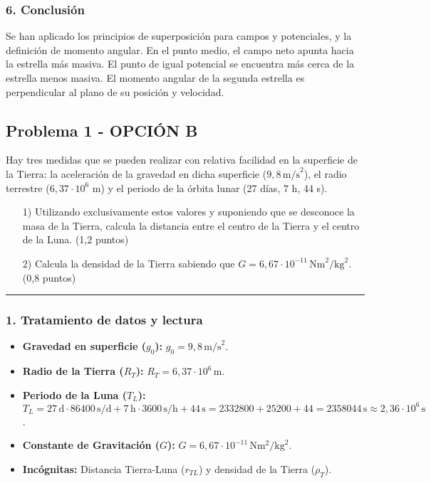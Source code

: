 \subsubsection*{6. Conclusión}
\begin{cajaconclusion}
Se han aplicado los principios de superposición para campos y potenciales, y la definición de momento angular. En el punto medio, el campo neto apunta hacia la estrella más masiva. El punto de igual potencial se encuentra más cerca de la estrella menos masiva. El momento angular de la segunda estrella es perpendicular al plano de su posición y velocidad.
\end{cajaconclusion}

\newpage

\subsection{Problema 1 - OPCIÓN B}
\label{subsec:1B_2009_jun_ord}

\begin{cajaenunciado}
Hay tres medidas que se pueden realizar con relativa facilidad en la superficie de la Tierra: la aceleración de la gravedad en dicha superficie ($9,8\,\text{m/s}^2$), el radio terrestre ($6,37\cdot10^6$ m) y el periodo de la órbita lunar (27 días, 7 h, 44 s).
\begin{enumerate}
    \item[1)] Utilizando exclusivamente estos valores y suponiendo que se desconoce la masa de la Tierra, calcula la distancia entre el centro de la Tierra y el centro de la Luna. (1,2 puntos)
    \item[2)] Calcula la densidad de la Tierra sabiendo que $G=6,67\cdot10^{-11}\,\text{Nm}^2/\text{kg}^2$. (0,8 puntos)
\end{enumerate}
\end{cajaenunciado}
\hrule

\subsubsection*{1. Tratamiento de datos y lectura}
\begin{itemize}
    \item \textbf{Gravedad en superficie ($g_0$):} $g_0 = 9,8 \, \text{m/s}^2$.
    \item \textbf{Radio de la Tierra ($R_T$):} $R_T = 6,37 \cdot 10^6 \, \text{m}$.
    \item \textbf{Periodo de la Luna ($T_L$):} $T_L = 27\,\text{d} \cdot 86400\,\text{s/d} + 7\,\text{h} \cdot 3600\,\text{s/h} + 44\,\text{s} = 2332800 + 25200 + 44 = 2358044 \, \text{s} \approx 2,36 \cdot 10^6 \, \text{s}$.
    \item \textbf{Constante de Gravitación ($G$):} $G=6,67\cdot10^{-11}\,\text{N}\text{m}^2/\text{kg}^2$.
    \item \textbf{Incógnitas:} Distancia Tierra-Luna ($r_{TL}$) y densidad de la Tierra ($\rho_T$).
\end{itemize}

